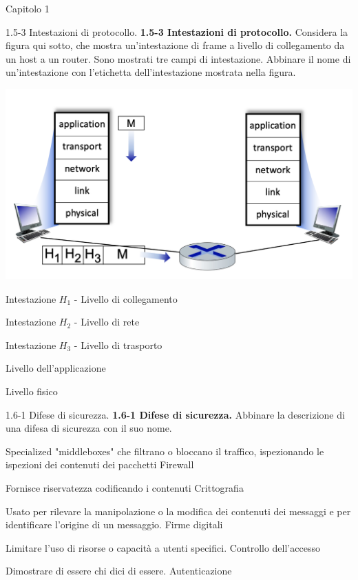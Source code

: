 \documentclass[a4paper]{article}
\begin{document}
\begin{quiz}{Capitolo 1}
\begin{matching}[points=1]{1.5-3 Intestazioni di protocollo.}
\textbf{1.5-3 Intestazioni di protocollo.}
Considera la figura qui sotto, che mostra un'intestazione di frame a livello di collegamento da un host a un router. Sono mostrati tre campi di intestazione. Abbinare il nome di un'intestazione con l'etichetta dell'intestazione mostrata nella figura.

\begin{center}
\includegraphics[width=\linewidth]{figs/1.5.3.jpg}
\end{center}

\item Intestazione $H_1$ - Livello di collegamento
\item Intestazione $H_2$ - Livello di rete
\item Intestazione $H_3$ - Livello di trasporto
\item Livello dell'applicazione
\item Livello fisico
\end{matching}


\begin{matching}[points=1]{1.6-1 Difese di sicurezza.}
\textbf{1.6-1 Difese di sicurezza.}
Abbinare la descrizione di una difesa di sicurezza con il suo nome.

\item Specialized "middleboxes" che filtrano o bloccano il traffico, ispezionando le ispezioni dei contenuti dei pacchetti \answer Firewall
\item Fornisce riservatezza codificando i contenuti \answer Crittografia
\item Usato per rilevare la manipolazione o la modifica dei contenuti dei messaggi e per identificare l'origine di un messaggio. \answer Firme digitali
\item Limitare l'uso di risorse o capacità a utenti specifici. \answer Controllo dell'accesso
\item Dimostrare di essere chi dici di essere. \answer Autenticazione
\end{matching}



\end{quiz}
\end{document}
